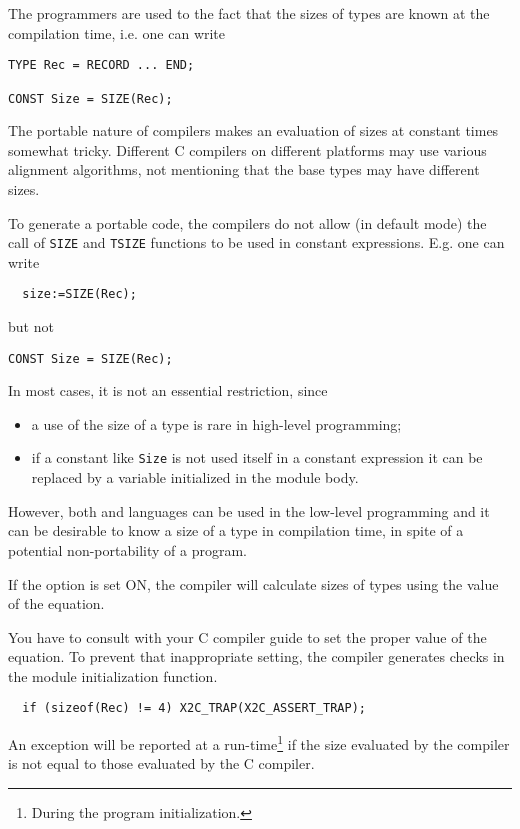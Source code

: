 The  programmers  are  used  to  the fact that the sizes of types are
known at the compilation time, i.e. one can write
\begin{verbatim}
TYPE Rec = RECORD ... END;

CONST Size = SIZE(Rec);
\end{verbatim}
The  portable  nature  of \xds{} compilers makes an evaluation of
sizes at constant times somewhat tricky. Different C compilers on
different  platforms  may use various alignment algorithms, not
mentioning that the base types may have different sizes.

To  generate  a  portable  code, the \xds{} compilers do not allow (in
default  mode) the  call  of {\tt SIZE} and {\tt TSIZE}
functions to be used in constant expressions. E.g. one can write
\begin{verbatim}
  size:=SIZE(Rec);
\end{verbatim}
but not
\begin{verbatim}
CONST Size = SIZE(Rec);
\end{verbatim}

In most cases, it is not an essential restriction, since
\begin{itemize}
\item   a use of the size of a type is rare in high-level programming;
\item   if a constant like {\tt Size} is not used itself in a constant
        expression it can be replaced by a variable initialized
        in the module body.
\end{itemize}
However,  both \mt{} and \ot{} languages can be used in the low-level
programming  and  it can be desirable to know a size of a type in
compilation  time,  in  spite  of a potential non-portability  of a
program.

If the  option is set ON,
the compiler will calculate sizes of types using the value
of the  equation.

You have to consult with your C compiler guide to set the proper
value of the equation. To prevent that inappropriate setting,        %
the compiler generates checks in the module
initialization function.
\begin{verbatim}
  if (sizeof(Rec) != 4) X2C_TRAP(X2C_ASSERT_TRAP);
\end{verbatim}
An exception will be reported at a run-time\footnote{During the program
initialization.} if the size evaluated by the \xds{} compiler
is not equal to those evaluated by the C compiler.

